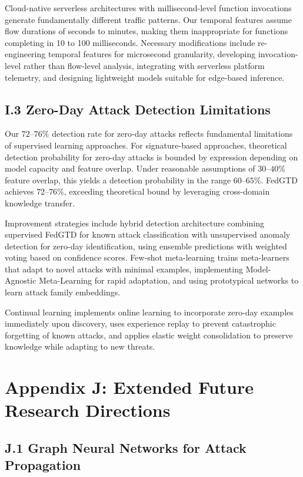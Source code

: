 \documentclass[12pt,a4paper]{article}
\theoremstyle{definition}
\begin{document}
Cloud-native serverless architectures with millisecond-level function invocations generate fundamentally different traffic patterns. Our temporal features assume flow durations of seconds to minutes, making them inappropriate for functions completing in 10 to 100 milliseconds. Necessary modifications include re-engineering temporal features for microsecond granularity, developing invocation-level rather than flow-level analysis, integrating with serverless platform telemetry, and designing lightweight models suitable for edge-based inference.

\subsection{I.3 Zero-Day Attack Detection Limitations}

Our $72$--$76\%$ detection rate for zero-day attacks reflects fundamental limitations of supervised learning approaches. For signature-based approaches, theoretical detection probability for zero-day attacks is bounded by expression depending on model capacity and feature overlap. Under reasonable assumptions of $30$--$40\%$ feature overlap, this yields a detection probability in the range $60$--$65\%$. FedGTD achieves $72$--$76\%$, exceeding theoretical bound by leveraging cross-domain knowledge transfer.

Improvement strategies include hybrid detection architecture combining supervised FedGTD for known attack classification with unsupervised anomaly detection for zero-day identification, using ensemble predictions with weighted voting based on confidence scores. Few-shot meta-learning trains meta-learners that adapt to novel attacks with minimal examples, implementing Model-Agnostic Meta-Learning for rapid adaptation, and using prototypical networks to learn attack family embeddings.

Continual learning implements online learning to incorporate zero-day examples immediately upon discovery, uses experience replay to prevent catastrophic forgetting of known attacks, and applies elastic weight consolidation to preserve knowledge while adapting to new threats.

\section{Appendix J: Extended Future Research Directions}

\subsection{J.1 Graph Neural Networks for Attack Propagation}
\end{document}
